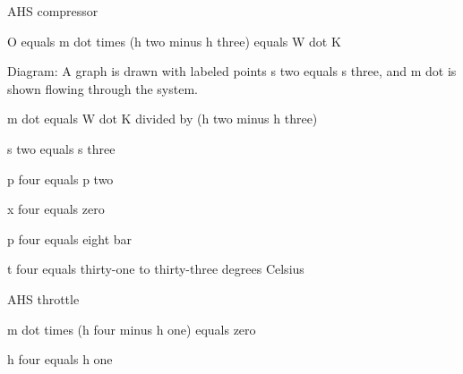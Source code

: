 AHS compressor  

O equals m dot times (h two minus h three) equals W dot K  

Diagram: A graph is drawn with labeled points s two equals s three, and m dot is shown flowing through the system.  

m dot equals W dot K divided by (h two minus h three)  

s two equals s three  

p four equals p two  

x four equals zero  

p four equals eight bar  

t four equals thirty-one to thirty-three degrees Celsius  

AHS throttle  

m dot times (h four minus h one) equals zero  

h four equals h one